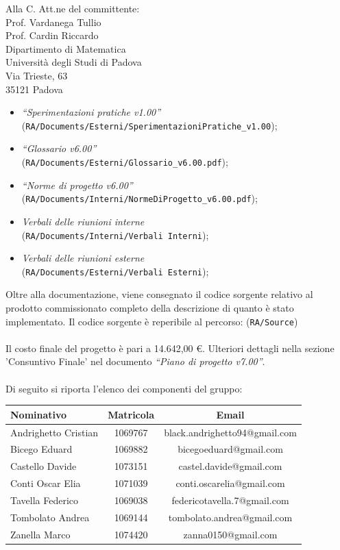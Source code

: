 \documentclass[a4paper,12pt]{letteracdp}
\begin{document}
\begin{letter}{
		Alla C. Att.ne del committente: \\
		Prof. Vardanega Tullio \\
		Prof. Cardin Riccardo \\
		Dipartimento di Matematica \\
		Università degli Studi di Padova \\
		Via Trieste, 63 \\
		35121 Padova}
\begin{itemize}
	\item \textit{“Sperimentazioni pratiche v1.00”} \\(\texttt{RA/Documents/Esterni/SperimentazioniPratiche\_v1.00});
	
	\item \textit{“Glossario v6.00”} \\(\texttt{RA/Documents/Esterni/Glossario\_v6.00.pdf});
	
	\item \textit{“Norme di progetto v6.00”} \\(\texttt{RA/Documents/Interni/NormeDiProgetto\_v6.00.pdf});

	\item \textit{Verbali delle riunioni interne}	\\(\texttt{RA/Documents/Interni/Verbali Interni});
	
	\item \textit{Verbali delle riunioni esterne}	\\(\texttt{RA/Documents/Esterni/Verbali Esterni});
		
\end{itemize}

Oltre alla documentazione, viene consegnato il codice sorgente relativo al prodotto commissionato completo della descrizione di quanto è stato implementato. Il codice sorgente è reperibile al percorso: (\texttt{RA/Source})\\ \\
Il costo finale del progetto è pari a 14.642,00 \euro. Ulteriori dettagli nella sezione 'Consuntivo Finale' nel documento \textit{“Piano di progetto v7.00”}.\\ \\
Di seguito si riporta l'elenco dei componenti del gruppo:

\begin{center}
		\begin{tabular}{l c c}
			\toprule
			\textbf{Nominativo} & \textbf{Matricola} & \textbf{Email} \\
			\midrule
			Andrighetto Cristian & 1069767 & black.andrighetto94@gmail.com \\
			Bicego Eduard & 1069882 & bicegoeduard@gmail.com  \\
			Castello Davide	& 1073151 &	 castel.davide@gmail.com\\
			Conti Oscar Elia & 1071039 & conti.oscarelia@gmail.com \\
			Tavella Federico & 1069038 & federicotavella.7@gmail.com\\
			Tombolato Andrea & 1069144 & tombolato.andrea@gmail.com	 \\
			Zanella Marco & 1074420 & zanna0150@gmail.com \\
			\bottomrule
		\end{tabular}
\end{center}
		

\end{letter}
\end{document}

